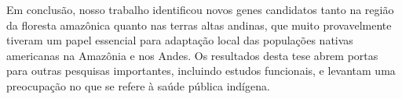 Em conclusão, nosso trabalho identificou  novos genes candidatos tanto na região da floresta amazônica quanto nas terras altas andinas, que muito provavelmente tiveram um papel essencial para adaptação local das populações nativas americanas na Amazônia e nos Andes. Os resultados desta tese abrem portas para outras pesquisas importantes, incluindo estudos funcionais, e levantam uma preocupação no que se refere à saúde pública indígena.
